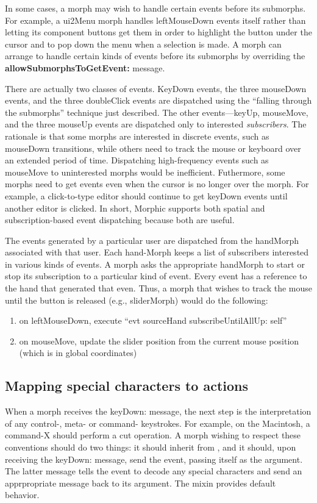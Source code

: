\documentclass[letterpaper,10pt,english]{sphinxmanual}
\begin{document}
In some cases, a morph may wish to handle certain events before its submorphs. For example, a ui2Menu morph handles leftMouseDown events itself rather than letting its component buttons get them in order to highlight the button under the cursor and to pop down the menu when a selection is made. A morph can arrange to handle certain kinds of events before its submorphs by overriding the \textbf{allowSubmorphsToGetEvent:} message.

There are actually two classes of events. KeyDown events, the three mouseDown events, and the three doubleClick events are dispatched using the ``falling through the submorphs'' technique just described. The other events—keyUp, mouseMove, and the three mouseUp events are dispatched only to interested \emph{subscribers}. The rationale is that some morphs are interested in discrete events, such as mouseDown transitions, while others need to track the mouse or keyboard over an extended period of time. Dispatching high-frequency events such as mouseMove to uninterested morphs would be inefficient. Futhermore, some morphs need to get events even when the cursor is no longer over the morph. For example, a click-to-type editor should continue to get keyDown events until another editor is clicked. In short, Morphic supports both spatial and subscription-based event dispatching because both are useful.

The events generated by a particular user are dispatched from the handMorph associated with that user. Each hand-Morph keeps a list of subscribers interested in various kinds of events. A morph asks the appropriate handMorph to start or stop its subscription to a particular kind of event. Every event has a reference to the hand that generated that even. Thus, a morph that wishes to track the mouse until the button is released (e.g., sliderMorph) would do the following:
\begin{enumerate}
\item {} 
on leftMouseDown, execute ``evt sourceHand subscribeUntilAllUp: self''

\item {} 
on mouseMove, update the slider position from the current mouse position (which is in global coordinates)

\end{enumerate}


\subsection{Mapping special characters to actions}
\label{morphic:mapping-special-characters-to-actions}
When a morph receives the keyDown: message, the next step is the interpretation of any control-, meta- or command- keystrokes. For example, on the Macintosh, a command-X should perform a cut operation. A morph wishing to respect these conventions should do two things: it should inherit from , and it should, upon receiving the keyDown: message, send  the event, passing itself as the argument. The latter message tells the event to decode any special characters and send an apprpropriate message back to its argument. The mixin provides default behavior.
\end{document}

